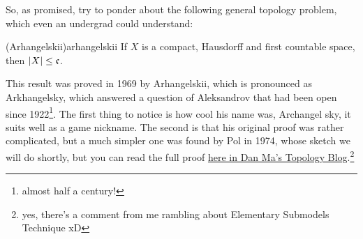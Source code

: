 So, as promised, try to ponder about the following general topology problem, which even an undergrad could understand:

\begin{theorem}{(Arhangelskii)}{arhangelskii}
    If $X$ is a compact, Hausdorff and first countable space, then $\lvert X\rvert\leq\mathfrak{c}$.
\end{theorem}

This result was proved in 1969 by Arhangelskii, which is pronounced as Arkhangelsky, which answered a question of Aleksandrov that had been open since 1922\footnote{almost half a century!}. The first thing to notice is how cool his name was, Archangel sky, it suits well as a game nickname. The second is that his original proof was rather complicated, but a much simpler one was found by Pol in 1974, whose sketch we will do shortly, but you can read the full proof \href{https://dantopology.wordpress.com/2010/06/12/the-cardinality-of-first-countable-compact-spaces-i/}{here in Dan Ma's Topology Blog}.\footnote{yes, there's a comment from me rambling about Elementary Submodels Technique xD}

